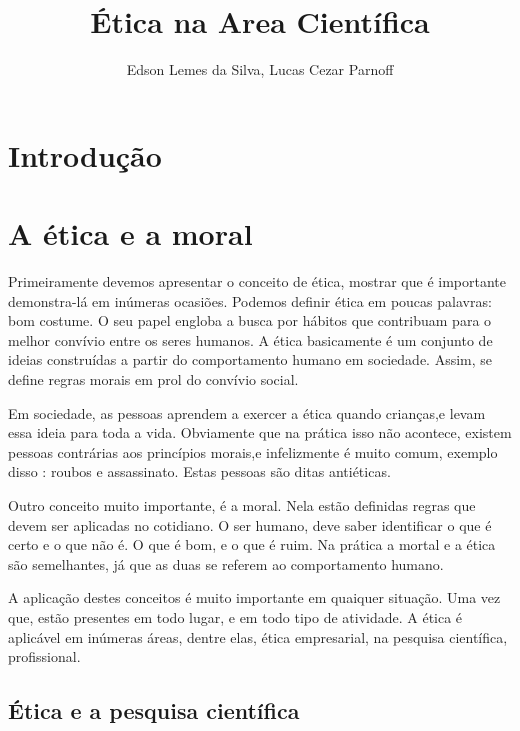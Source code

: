 \documentclass[12pt]{article}
\title{Ética na Area Científica}
\author{Edson Lemes da Silva\inst{1}, Lucas Cezar Parnoff\inst{1}  }
\begin{document}
 

\maketitle

\begin{abstract}
  
\end{abstract}
     
\begin{resumo} 
  
\end{resumo}


\section{Introdução}

\section{A ética e a moral}\label{sec:conteudo}


Primeiramente devemos apresentar o conceito de ética, mostrar que é importante demonstra-lá em inúmeras ocasiões.
Podemos definir ética em poucas palavras: bom costume. O seu papel engloba a busca por hábitos que contribuam para o melhor convívio entre os seres humanos. A ética basicamente é um conjunto de ideias construídas a partir do comportamento humano em sociedade. Assim, se define regras morais em prol do convívio social.

Em sociedade, as pessoas aprendem a exercer a ética quando crianças,e levam essa ideia para toda a vida. Obviamente que na prática isso não acontece, existem pessoas contrárias aos princípios morais,e infelizmente é muito comum, exemplo disso : roubos e assassinato. Estas pessoas são ditas antiéticas.

Outro conceito muito importante, é a moral. Nela estão definidas regras que devem ser aplicadas no cotidiano. O ser humano, deve saber identificar o que é certo e o que não é. O que é bom, e o que é ruim. Na prática a mortal e a ética são semelhantes, já que as duas se referem ao comportamento humano.

A aplicação destes conceitos é muito importante em quaiquer situação. Uma vez que, estão presentes em todo lugar, e em todo tipo de atividade. A ética é aplicável em inúmeras áreas, dentre elas, ética empresarial, na pesquisa científica, profissional.


\subsection{Ética e a pesquisa científica} \label{sec:sub1}






\end{document}
